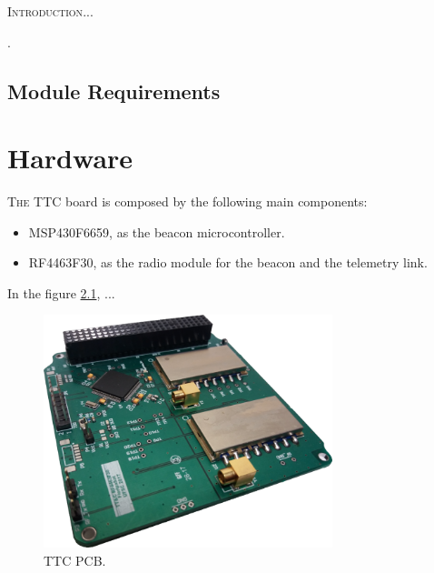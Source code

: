 \documentclass[12pt]{book}
\begin{document}

\lettrine{I}{ntroduction}...


\cite{site}.

\section{Module Requirements}


\chapter{Hardware}

\lettrine{T}{he} TTC board is composed by the following main components:

\begin{itemize}
	\item MSP430F6659, as the beacon microcontroller.
	\item RF4463F30, as the radio module for the beacon and the telemetry link.
\end{itemize}

In the figure \ref{fig:ttc-board}, ...

\begin{figure}[!h]
	\begin{center}
		\includegraphics[width=0.75\textwidth]{figures/ttc_board.png}
		\caption{TTC PCB.}
		\label{fig:ttc-board}
	\end{center}
\end{figure}
\end{document}
